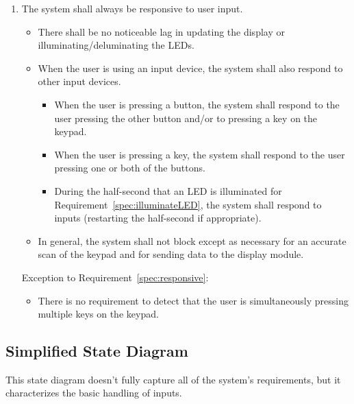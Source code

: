 \begin{enumerate}
    \item \label{spec:responsive} The system shall always be responsive to user input.
        \begin{itemize}
            \item There shall be no noticeable lag in updating the display or illuminating/deluminating the LEDs.
            \item When the user is using an input device, the system shall also respond to other input devices.
                \begin{itemize}
                    \item When the user is pressing a button, the system shall respond to the user pressing the other button and/or to pressing a key on the keypad.
                    \item When the user is pressing a key, the system shall respond to the user pressing one or both of the buttons.
                    \item During the half-second that an LED is illuminated for Requirement~\ref{spec:illuminateLED}, the system shall respond to inputs (restarting the half-second if appropriate).
                \end{itemize}
            \item In general, the system shall not block except as necessary for an accurate scan of the keypad and for sending data to the display module.
        \end{itemize}
        Exception to Requirement~\ref{spec:responsive}:
        \begin{itemize}
            \item There is no requirement to detect that the user is simultaneously pressing multiple keys on the keypad.
        \end{itemize}
\end{enumerate}


\subsection{Simplified State Diagram}

This state diagram doesn't fully capture all of the system's requirements,
but it characterizes the basic handling of inputs.

